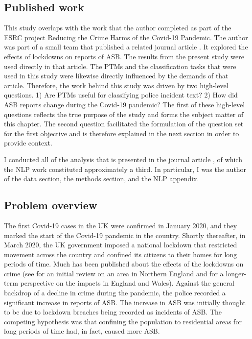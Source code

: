  
 \subsection{Published work} This study overlaps with the work that the author completed as part of the ESRC project Reducing the Crime Harms of the Covid-19 Pandemic. The author was part of a small team that published a related journal article  \parencite{halford_dixon_farrell_2022}. It explored the effects of lockdowns on reports of ASB. The results from the present study were used directly in that article. The PTMs and the classification tasks that were used in this study were likewise directly influenced by the demands of that article. Therefore, the work behind this study was driven by two high-level questions. 1) Are PTMs useful for classifying police incident text? 2) How did ASB reports change during the Covid-19 pandemic? The first of these high-level questions reflects the true purpose of the study and forms the subject matter of this chapter. The second question facilitated the formulation of the question set for the first objective and is therefore explained in the next section in order to provide context. 

I conducted all of the analysis that is presented in the journal article \parencite{halford_dixon_farrell_2022}, of which the NLP work constituted approximately a third. In particular, I was the author of the data section, the methods section, and the NLP appendix.

\subsection{Problem overview} The first Covid-19 cases in the UK were confirmed in January 2020, and they marked the start of the Covid-19 pandemic in the country. Shortly thereafter, in March 2020, the UK government imposed a national lockdown that restricted movement across the country and confined its citizens to their homes for long periods of time. Much has been published about the effects of the lockdowns on crime (see \parencite{halford2020crime} for an initial review on an area in Northern England and \parencite{langton2021six}  for a longer-term perspective on the impacts in England and Wales). Against the general backdrop of a decline in crime during the pandemic, the police recorded a significant increase in reports of ASB. The increase in ASB was initially thought to be due to lockdown breaches being recorded as incidents of ASB. The competing hypothesis was that confining the population to residential areas for long periods of time had, in fact, caused more ASB.

